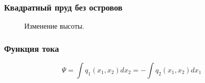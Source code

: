 \documentclass[10pt,utf8,presentation,compress]{beamer}
\begin{document}
\begin{frame}
\frametitle{Квадратный пруд без островов}
	\begin{figure}[H]
		\centering
		\hfill
		\hfill
		\caption{Изменение высоты.}
	\end{figure}
\end{frame}

\begin{frame}
\frametitle{Функция тока}
	\begingroup
	\LARGE
		\begin{equation*}
			\Psi = \int q_1(x_1, x_2) dx_2 = - \int q_2(x_1, x_2) dx_1
		\end{equation*}
	\endgroup
\end{frame}
\end{document}
